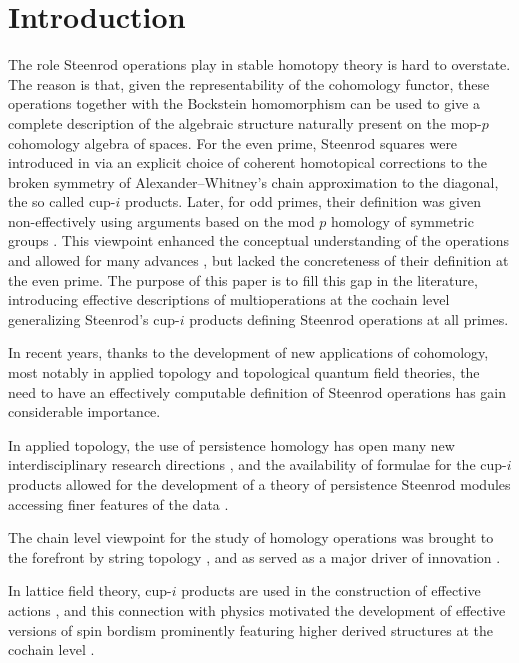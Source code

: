 
\section{Introduction} \label{s:introduction}

The role Steenrod operations play in stable homotopy theory is hard to overstate.
The reason is that, given the representability of the cohomology functor, these operations together with the Bockstein homomorphism can be used to give a complete description of the algebraic structure naturally present on the mop-$p$ \mbox{cohomology} algebra of spaces.
For the even prime, Steenrod squares were introduced in \cite{steenrod1947products} via an explicit choice of coherent homotopical corrections to the broken symmetry of Alexander--Whitney's chain approximation to the diagonal, the so called cup-$i$ products.
Later, for odd primes, their definition was given non-effectively using arguments based on the mod $p$ homology of symmetric groups \cite{steenrod1952reduced, steenrod1962cohomology, steenrod1962cohomology}.
This viewpoint enhanced the conceptual understanding of the operations and allowed for many advances \cite{adem1952iteration, milnor1958dual, adams1995stable}, but lacked the concreteness of their definition at the even prime.
The purpose of this paper is to fill this gap in the literature, introducing effective descriptions of multioperations at the cochain level generalizing Steenrod's cup-$i$ products defining Steenrod operations at all primes.

In recent years, thanks to the development of new applications of cohomology, most notably in applied topology and topological quantum field theories, the need to have an effectively computable definition of Steenrod operations has gain considerable importance.

In applied topology, the use of persistence homology \cite{edelsbrunner2002topological, carlsson2005barcode} has open many new interdisciplinary research directions \cite{chan2013viral, hess2017cliques}, and the availability of formulae for the cup-$i$ products allowed for the development of a theory of persistence Steenrod modules accessing finer features of the data \cite{medina2018persistence}.

The chain level viewpoint for the study of homology operations was brought to the forefront by string topology \cite{sullivan2007presentstate}, and as served as a major driver of innovation \cite{tradler2007string, hoch2}.

In lattice field theory, cup-$i$ products are used in the construction of effective actions \cite{gaiotto2016spin, bhardwaj2017fermionic, kapustin2017fermionic}, and this connection with physics motivated the development of effective versions of spin bordism \cite{brumfiel2016pontrjagin, brumfiel2018quadratic} prominently featuring higher derived structures at the cochain level \cite{medina2020cartan, medina2021adem}.

